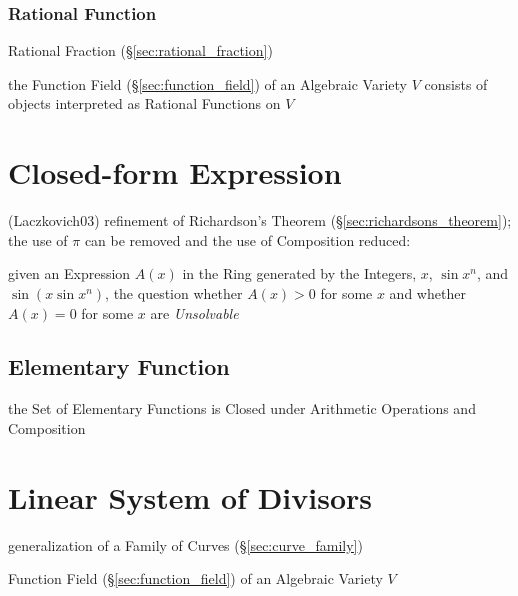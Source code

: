 \subsubsection{Rational Function}\label{sec:rational_function}

Rational Fraction (\S\ref{sec:rational_fraction})

the Function Field (\S\ref{sec:function_field}) of an Algebraic Variety $V$
consists of objects interpreted as Rational Functions on $V$



\section{Closed-form Expression}\label{sec:closed_form_expression}

(Laczkovich03) refinement of Richardson's Theorem
(\S\ref{sec:richardsons_theorem}); the use of $\pi$ can be removed and the use
of Composition reduced:

given an Expression $A(x)$ in the Ring generated by the Integers, $x$, $\sin
x^n$, and $\sin(x \sin x^n)$, the question whether $A(x) > 0$ for some $x$ and
whether $A(x) = 0$ for some $x$ are \emph{Unsolvable}



\subsection{Elementary Function}\label{sec:elementary_function}

the Set of Elementary Functions is Closed under Arithmetic Operations and
Composition



\section{Linear System of Divisors}\label{sec:linear_system_of_divisors}

generalization of a Family of Curves (\S\ref{sec:curve_family})

Function Field (\S\ref{sec:function_field}) of an Algebraic Variety $V$

